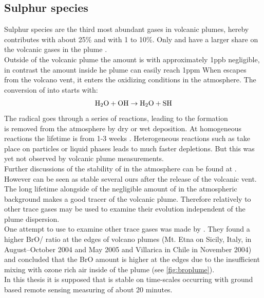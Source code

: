\documentclass  [
  paper    = a4,
  BCOR     = 10mm,
  twoside,
  fontsize = 12pt,
  fleqn,
  toc      = bibnumbered,
  toc      = listofnumbered,
  numbers  = noendperiod,
  headings = normal,
  listof   = leveldown,
  version  = 3.03
]                                       {scrreprt}
\begin{document}
\subsection{Sulphur species\label{chap:so2}}
Sulphur species are the third most abundant gases in volcanic plumes, hereby contributes   with about 25\% and  with 1 to 10\%. Only  and  have a larger share on the volcanic gases in the plume .\\
Outside of the volcanic plume the   amount is with approximately 1ppb negligible, in contrast the   amount inside he plume can easily reach 1ppm \cite{Coppenheimer 2003}
When  escapes from the volcano vent, it enters the oxidizing conditions in the atmosphere. The conversion of  into  starts with:
\begin{equation*}
\ce{H2O}+\ce{OH}\rightarrow \ce{H2O}+\ce{SH}
\end{equation*}
The  radical goes through a series of reactions, leading to the  formation \cite{Seinfeld}\\
 is removed from the atmosphere by dry or wet
deposition. At homogeneous reactions the lifetime is from 1-3 weeks \cite{robock2000volcanic}. Heterogeneous reactions such as take place on particles or liquid phases leads to much faster depletions. But this was yet not observed by volcanic plume measurements.\\
Further discussions of the stability of   in the atmosphere can be found at \cite{lubcke2014optical}.\\
However  can be seen as stable several ours after the release of the volcanic vent.\\ The long lifetime  alongside of the negligible amount of  in the atmospheric background makes  a good tracer of the volcanic plume.
Therefore relatively to other trace gases  may be used to examine their evolution independent of the plume dispersion.\\
One attempt to use  to examine other trace gases was made by \cite{bobrowski2007reactive}. They found a higher BrO/ ratio at the edges of volcano plumes (Mt. Etna on Sicily, Italy, in August–October 2004 and May 2005 and Villarica in Chile in November 2004) and concluded that the BrO amount is higher at the edges due to the insufficient mixing with ozone rich air inside of the plume (see \ref{fig:broplume}).\\
In this thesis it is supposed that   is stable on time-scales occurring with ground based remote sensing measuring of about 20 minutes. \\
\end{document}
